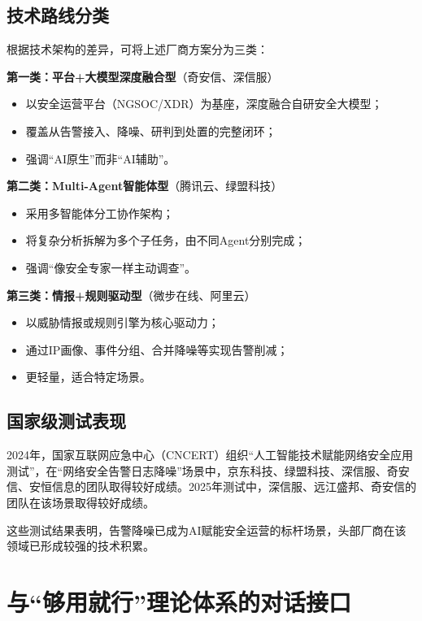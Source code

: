 \documentclass[11pt,a4paper]{article}
\begin{document}
\subsection{技术路线分类}

根据技术架构的差异，可将上述厂商方案分为三类：

\textbf{第一类：平台+大模型深度融合型}（奇安信、深信服）
\begin{itemize}
    \item 以安全运营平台（NGSOC/XDR）为基座，深度融合自研安全大模型；
    \item 覆盖从告警接入、降噪、研判到处置的完整闭环；
    \item 强调“AI原生”而非“AI辅助”。
\end{itemize}

\textbf{第二类：Multi-Agent智能体型}（腾讯云、绿盟科技）
\begin{itemize}
    \item 采用多智能体分工协作架构；
    \item 将复杂分析拆解为多个子任务，由不同Agent分别完成；
    \item 强调“像安全专家一样主动调查”。
\end{itemize}

\textbf{第三类：情报+规则驱动型}（微步在线、阿里云）
\begin{itemize}
    \item 以威胁情报或规则引擎为核心驱动力；
    \item 通过IP画像、事件分组、合并降噪等实现告警削减；
    \item 更轻量，适合特定场景。
\end{itemize}

\subsection{国家级测试表现}

2024年，国家互联网应急中心（CNCERT）组织“人工智能技术赋能网络安全应用测试”，在“网络安全告警日志降噪”场景中，京东科技、绿盟科技、深信服、奇安信、安恒信息的团队取得较好成绩。2025年测试中，深信服、远江盛邦、奇安信的团队在该场景取得较好成绩。

这些测试结果表明，告警降噪已成为AI赋能安全运营的标杆场景，头部厂商在该领域已形成较强的技术积累。

\section{与“够用就行”理论体系的对话接口}
\end{document}
